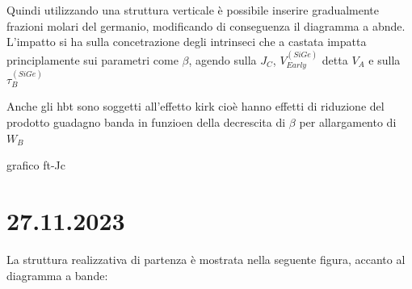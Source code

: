 Quindi utilizzando una struttura verticale è possibile inserire gradualmente frazioni molari del germanio, modificando di conseguenza il diagramma a abnde. L'impatto si ha sulla concetrazione degli intrinseci che a castata impatta principlamente sui parametri come $\beta$, agendo sulla $J_C$, $V_{Early}^(SiGe)$ detta $V_{A}$ e sulla $\tau_B^{(SiGe)}$

Anche gli hbt sono soggetti all'effetto kirk cioè hanno effetti di riduzione del prodotto guadagno banda in funzioen della decrescita di $\beta$ per allargamento di $W_B$

grafico ft-Jc



\cleardoublepage

\section*{27.11.2023}
La struttura realizzativa di partenza è mostrata nella seguente figura, accanto al diagramma a bande:
%
